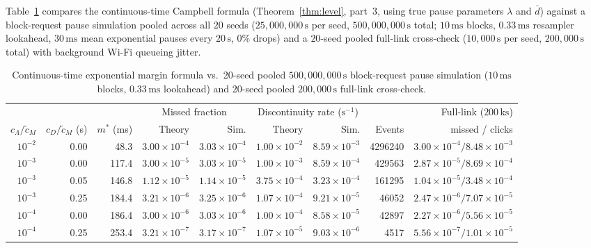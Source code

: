 \documentclass[11pt,a4paper]{article}
\theoremstyle{definition}
\begin{document}
Table~\ref{tab:margin} compares the continuous-time Campbell formula
(Theorem~\ref{thm:level}, part~3, using true pause parameters $\lambda$ and
$\bar d$) against a block-request pause simulation pooled across all $20$ seeds
($25{,}000{,}000\,\text{s}$ per seed, $500{,}000{,}000\,\text{s}$ total;
$10\,\text{ms}$ blocks, $0.33\,\text{ms}$ resampler lookahead, $30\,\text{ms}$
mean exponential pauses every $20\,\text{s}$, $0\%$ drops) and a $20$-seed
pooled full-link cross-check ($10{,}000\,\text{s}$ per seed, $200{,}000\,\text{s}$
total) with background Wi-Fi queueing jitter.

\begin{table}[htb]
\centering
\footnotesize
\setlength{\tabcolsep}{3.5pt}
\begin{tabular}{@{}rrr rr rr r r@{}}
\toprule
 & & & \multicolumn{2}{c}{Missed fraction}
 & \multicolumn{2}{c}{Discontinuity rate ($\text{s}^{-1}$)} & & Full-link ($200\,\text{ks}$) \\
\cmidrule(lr){4-5} \cmidrule(lr){6-7}
$c_\Lambda / \tilde c_M$ & $c_D / \tilde c_M$ (s) & $m^*$ (ms) & Theory & Sim. & Theory & Sim. & Events & missed / clicks \\
\midrule
$10^{-2}$ & 0.00 &  48.3 & $3.00{\times}10^{-4}$ & $3.03{\times}10^{-4}$ & $1.00{\times}10^{-2}$ & $8.59{\times}10^{-3}$ & 4296240 & $3.00{\times}10^{-4} / 8.48{\times}10^{-3}$ \\
$10^{-3}$ & 0.00 & 117.4 & $3.00{\times}10^{-5}$ & $3.03{\times}10^{-5}$ & $1.00{\times}10^{-3}$ & $8.59{\times}10^{-4}$ &  429563 & $2.87{\times}10^{-5} / 8.69{\times}10^{-4}$ \\
$10^{-3}$ & 0.05 & 146.8 & $1.12{\times}10^{-5}$ & $1.14{\times}10^{-5}$ & $3.75{\times}10^{-4}$ & $3.23{\times}10^{-4}$ &  161295 & $1.04{\times}10^{-5} / 3.48{\times}10^{-4}$ \\
$10^{-3}$ & 0.25 & 184.4 & $3.21{\times}10^{-6}$ & $3.25{\times}10^{-6}$ & $1.07{\times}10^{-4}$ & $9.21{\times}10^{-5}$ &   46052 & $2.47{\times}10^{-6} / 7.07{\times}10^{-5}$ \\
$10^{-4}$ & 0.00 & 186.4 & $3.00{\times}10^{-6}$ & $3.03{\times}10^{-6}$ & $1.00{\times}10^{-4}$ & $8.58{\times}10^{-5}$ &   42897 & $2.27{\times}10^{-6} / 5.56{\times}10^{-5}$ \\
$10^{-4}$ & 0.25 & 253.4 & $3.21{\times}10^{-7}$ & $3.17{\times}10^{-7}$ & $1.07{\times}10^{-5}$ & $9.03{\times}10^{-6}$ &    4517 & $5.56{\times}10^{-7} / 1.01{\times}10^{-5}$ \\
\bottomrule
\end{tabular}
\caption{Continuous-time exponential margin formula vs.\ 20-seed pooled
$500{,}000{,}000\,\text{s}$ block-request pause simulation ($10\,\text{ms}$
blocks, $0.33\,\text{ms}$ lookahead) and 20-seed pooled $200{,}000\,\text{s}$
full-link cross-check.}
\label{tab:margin}
\end{table}
\end{document}
